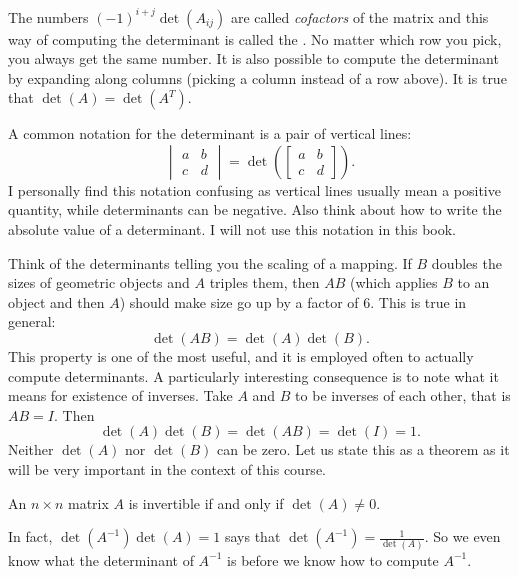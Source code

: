 The numbers ${(-1)}^{i+j}\det(A_{ij})$ are called
\emph{cofactors}
of the matrix and
this way of computing the determinant is called the
\emph{}.
No matter which row you pick, you always get the same number.
It is also possible to compute the
determinant by expanding
along columns (picking a column instead of a row above).
It is true that $\det(A) = \det(A^T)$.

A common notation for the determinant is a pair of vertical
lines:
\begin{equation*}
\begin{vmatrix}
a & b \\
c & d
\end{vmatrix}
=
\det \left(
\begin{bmatrix}
a & b \\
c & d
\end{bmatrix}
\right) .
\end{equation*}
I personally find this notation confusing as vertical lines usually
mean a positive quantity, while determinants can be negative.  Also
think about how to write the absolute value of a determinant.  I will not
use this notation in this book.

\medskip

Think of the determinants telling you the scaling of a mapping.  
If $B$ doubles the sizes of geometric objects and $A$ triples them,
then $AB$ (which applies $B$ to an object and then $A$) should make size
go up by a factor of $6$.  This is true in general:
\begin{equation*}
\det(AB) = \det(A)\det(B) .
\end{equation*}
This property is one of the most useful, and it is employed often to 
actually compute determinants.  A particularly interesting consequence is to
note what it means for existence of inverses.
Take $A$ and $B$ to be inverses of each other, that is $AB=I$.  Then
\begin{equation*}
\det(A)\det(B) = \det(AB) = \det(I) = 1 .
\end{equation*}
Neither $\det(A)$ nor $\det(B)$ can be zero.
Let us state this as a theorem
as it will be very important in the context of this course.

\begin{theorem1}{}
An $n \times n$ matrix $A$ is invertible if and only if $\det (A) \not= 0$.
\end{theorem1}

In fact, $\det(A^{-1}) \det(A) = 1$ says that $\det(A^{-1}) =
\frac{1}{\det(A)}$.  So we even know what the determinant of $A^{-1}$ is
before we know how to compute $A^{-1}$.

